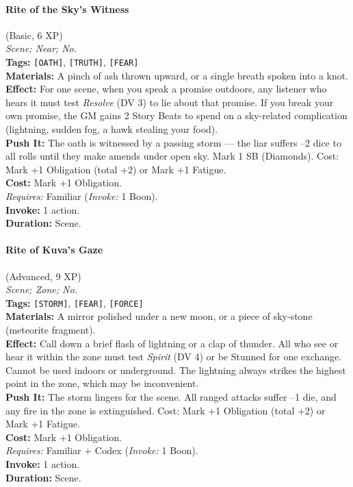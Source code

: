 \paragraph{Rite of the Sky's Witness} (Basic, 6 XP) \hfill \\
\emph{Scene; Near; No.} \\
\textbf{Tags:} \texttt{[OATH]}, \texttt{[TRUTH]}, \texttt{[FEAR]} \\
\textbf{Materials:} A pinch of ash thrown upward, or a single breath spoken into a knot. \\
\textbf{Effect:} For one scene, when you speak a promise outdoors, any listener who hears it must test \textit{Resolve} (DV 3) to lie about that promise. If you break your own promise, the GM gains 2 Story Beats to spend on a sky-related complication (lightning, sudden fog, a hawk stealing your food). \\
\textbf{Push It:} The oath is witnessed by a passing storm --- the liar suffers --2 dice to all rolls until they make amends under open sky. Mark 1 SB (Diamonds). Cost: Mark +1 Obligation (total +2) or Mark +1 Fatigue. \\
\textbf{Cost:} Mark +1 Obligation. \\
\textit{Requires:} Familiar (\textit{Invoke:} 1 Boon). \\
\textbf{Invoke:} 1 action. \\
\textbf{Duration:} Scene.

\paragraph{Rite of Kuva's Gaze} (Advanced, 9 XP) \hfill \\
\emph{Scene; Zone; No.} \\
\textbf{Tags:} \texttt{[STORM]}, \texttt{[FEAR]}, \texttt{[FORCE]} \\
\textbf{Materials:} A mirror polished under a new moon, or a piece of sky-stone (meteorite fragment). \\
\textbf{Effect:} Call down a brief flash of lightning or a clap of thunder. All who see or hear it within the zone must test \textit{Spirit} (DV 4) or be Stunned for one exchange. Cannot be used indoors or underground. The lightning always strikes the highest point in the zone, which may be inconvenient. \\
\textbf{Push It:} The storm lingers for the scene. All ranged attacks suffer --1 die, and any fire in the zone is extinguished. Cost: Mark +1 Obligation (total +2) or Mark +1 Fatigue. \\
\textbf{Cost:} Mark +1 Obligation. \\
\textit{Requires:} Familiar + Codex (\textit{Invoke:} 1 Boon). \\
\textbf{Invoke:} 1 action. \\
\textbf{Duration:} Scene.

